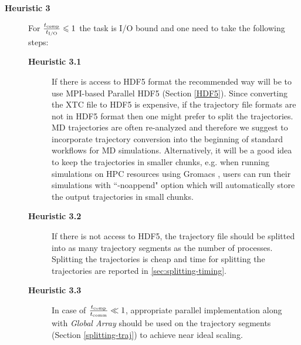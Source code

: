 \begin{description}
  \item[\textbf{Heuristic 3}] For $\frac{{t}_{\text{comp}}}{{t}_{\text{I/O}}} \leqslant 1$ the task is I/O bound and one need to take the following steps:  
  \begin{description}
    \item[\textbf{Heuristic 3.1}] If there is access to HDF5 format the recommended way will be to use MPI-based Parallel HDF5 (Section \ref{HDF5}). Since converting the XTC file to HDF5 is expensive, if the trajectory file formats are not in HDF5 format then one might prefer to split the trajectories. MD trajectories are often re-analyzed and therefore we suggest to incorporate trajectory conversion into the beginning of standard workflows for MD simulations. 
 Alternatively, it will be a good idea to keep the trajectories in smaller chunks, e.g. when running simulations on HPC resources using Gromacs \cite{Gromacs3, Gromacs1}, users can run their simulations with ``-noappend" option which   will automatically store the output trajectories in small chunks.
    \item[\textbf{Heuristic 3.2}] If there is not access to HDF5, the trajectory file should be splitted into as many trajectory segments as the number of processes. Splitting the trajectories is cheap and time for splitting the trajectories are reported in \ref{sec:splitting-timing}.
    \item[\textbf{Heuristic 3.3}] In case of $\frac{{t}_{\text{comp}}}{t_{\text{comm}}} \ll 1$, appropriate parallel implementation along with \emph{Global Array} should be used on the trajectory segments (Section \ref{splitting-traj}) to achieve near ideal scaling.
  \end{description}
\end{description}
